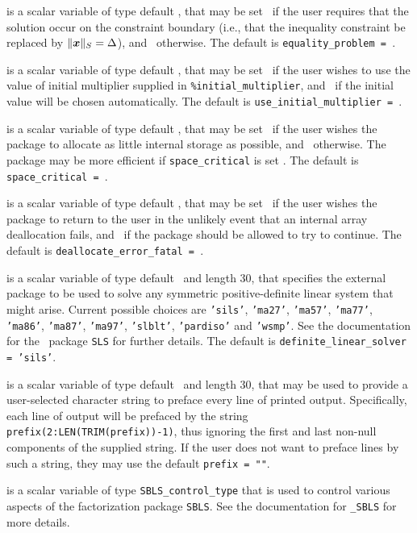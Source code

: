 \documentclass{galahad}
\begin{document}
\begin{description}
 is a scalar variable of type default \logical, that
may be set \true\ if the user requires that the solution
occur on the constraint boundary (i.e., that the inequality constraint be
replaced by $\|{\bm{x}}\|_S = \Delta$), and \false\ otherwise.
The default is {\tt equality\_problem = \false}.

 is a scalar variable of type default \logical,
that may be set \true\ if the user wishes to use the value of initial
multiplier supplied in {\tt \%initial\_multiplier},
and \false\ if the initial value will be chosen automatically.
The default is {\tt use\_initial\_multiplier = \false}.

 is a scalar variable of type default \logical, that
may be set \true\ if the user wishes the package to allocate as little
internal storage as possible, and \false\ otherwise. The package may
be more efficient if {\tt space\_critical} is set \false.
The default is {\tt space\_critical = \false}.

 is a scalar variable of type default \logical,
that may be set \true\ if the user wishes the package to return to the user
in the unlikely event that an internal array deallocation fails,
and \false\ if the package should be allowed to try to continue.
The default is {\tt deallocate\_error\_fatal = \false}.

 is a scalar variable of type default \character\
and length 30, that specifies the external package to be used to
solve any symmetric positive-definite linear system that might arise.
Current possible
choices are {\tt 'sils'}, {\tt 'ma27'}, {\tt 'ma57'}, {\tt 'ma77'},
{\tt 'ma86'}, {\tt 'ma87'}, {\tt 'ma97'}, {\tt 'slblt'}, {\tt 'pardiso'}
and {\tt 'wsmp'}.
See the documentation for the \galahad\ package {\tt SLS} for further details.
The default is {\tt definite\_linear\_solver = 'sils'}.

 is a scalar variable of type default \character\
and length 30, that may be used to provide a user-selected
character string to preface every line of printed output.
Specifically, each line of output will be prefaced by the string
{\tt prefix(2:LEN(TRIM(prefix))-1)},
thus ignoring the first and last non-null components of the
supplied string. If the user does not want to preface lines by such
a string, they may use the default {\tt prefix = ""}.

 is a scalar variable of type
{\tt SBLS\_control\_type} that is used to control various aspects of the
factorization package {\tt SBLS}. See the documentation for
{\tt \libraryname\_SBLS} for more details.


\end{description}
\end{document}
